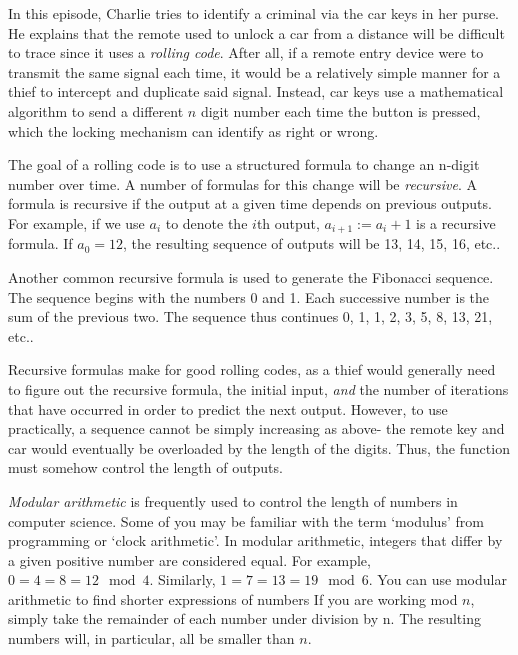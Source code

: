 \newpage
{}
{}
\setcounter{activity}{0}

In this episode, Charlie tries to identify a criminal via the car keys in her purse. He explains that the remote used to unlock a car from a distance will be difficult to trace since it uses a \emph{rolling code}. After all, if a remote entry device were to transmit the same signal each time, it would be a relatively simple manner for a thief to intercept and duplicate said signal. Instead, car keys use a mathematical algorithm to send a different $n$ digit number each time the button is pressed, which the locking mechanism can identify as right or wrong.




The goal of a rolling code is to use a structured formula to change an n-digit number over time. A number of formulas for this change will be \emph{recursive}. A formula is recursive if the output at a given time depends on previous outputs. For example, if we use $a_i$ to denote the $i$th output, $a_{i+1} := a_i + 1$ is a recursive formula. If $a_0= 12$, the resulting sequence of outputs will be 13, 14, 15, 16, etc..


Another common recursive formula is used to generate the Fibonacci sequence. The sequence begins with the numbers 0 and 1. Each successive number is the sum of the previous two. The sequence thus continues 0, 1, 1, 2, 3, 5, 8, 13, 21, etc..


Recursive formulas make for good rolling codes, as a thief would generally need to figure out the recursive formula, the initial input, \emph{and} the number of iterations that have occurred in order to predict the next output. However, to use practically, a sequence cannot be simply increasing as above- the remote key and car would eventually be overloaded by the length of the digits. Thus, the function must somehow control the length of outputs.




\emph{Modular arithmetic} is frequently used to control the length of numbers in computer science. Some of you may be familiar with the term `modulus' from programming or `clock arithmetic'. In modular arithmetic, integers that differ by a given positive number are considered equal. For example, $0 = 4 = 8 = 12 \mod 4$. Similarly, $1 = 7 = 13 = 19 \mod 6$. You can use modular arithmetic to find shorter expressions of numbers If you are working mod $n$, simply take the remainder of each number under division by n. The resulting numbers will, in particular, all be smaller than $n$.


